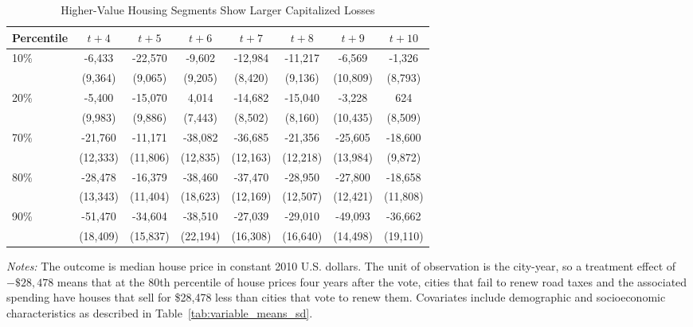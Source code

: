\begin{table}[H]
    \centering
    \caption{Higher-Value Housing Segments Show Larger Capitalized Losses}
    \label{tab:quantile_tes}
    \begin{threeparttable}
    \begin{minipage}{\linewidth}
    \centering
    \begin{tabular}{p{1.5cm}ccccccc}
        \hline
        Percentile & $t + 4$ & $t + 5$ & $t + 6$ & $t + 7$ & $t + 8$ & $t + 9$ & $t + 10$ \\
        \hline
        10\% & -6,433 & -22,570 & -9,602 & -12,984 & -11,217 & -6,569 & -1,326 \\
             & (9,364) & (9,065) & (9,205) & (8,420) & (9,136) & (10,809) & (8,793) \\
        20\% & -5,400 & -15,070 & 4,014 & -14,682 & -15,040 & -3,228 & 624 \\
             & (9,983) & (9,886) & (7,443) & (8,502) & (8,160) & (10,435) & (8,509) \\
        70\% & -21,760 & -11,171 & -38,082 & -36,685 & -21,356 & -25,605 & -18,600 \\
             & (12,333) & (11,806) & (12,835) & (12,163) & (12,218) & (13,984) & (9,872) \\
        80\% & -28,478 & -16,379 & -38,460 & -37,470 & -28,950 & -27,800 & -18,658 \\
             & (13,343) & (11,404) & (18,623) & (12,169) & (12,507) & (12,421) & (11,808) \\
        90\% & -51,470 & -34,604 & -38,510 & -27,039 & -29,010 & -49,093 & -36,662 \\
             & (18,409) & (15,837) & (22,194) & (16,308) & (16,640) & (14,498) & (19,110) \\
        \hline
    \end{tabular}
    \vspace{0.5em}
    \begin{tablenotes}[flushleft]
        \small
        \item \textit{Notes:} The outcome is median house price in constant 2010 U.S. dollars. The unit of observation is the city-year, so a treatment effect of \(-\$28{,}478\) means that at the 80th percentile of house prices four years after the vote, cities that fail to renew road taxes and the associated spending have houses that sell for \$28,478 less than cities that vote to renew them. Covariates include demographic and socioeconomic characteristics as described in Table~\ref{tab:variable_means_sd}.
    \end{tablenotes}
    \end{minipage}
    \end{threeparttable}
\end{table}


